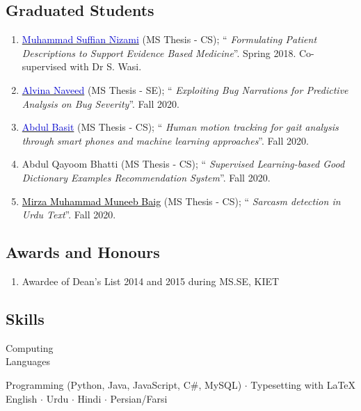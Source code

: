 \documentclass[a4paper, 10pt]{article}
\begin{document}
\subsection*{\textcolor{NavyBlue}{Graduated Students}}
\begin{enumerate}
\itemsep-4pt
\item \href{https://www.linkedin.com/in/msuffian/}{\textcolor{MediumBlue}{Muhammad Suffian Nizami}} (MS Thesis - CS); ``\emph{ Formulating Patient Descriptions to Support Evidence Based Medicine}''. Spring 2018. Co-supervised with Dr S. Wasi.

\item \href{https://www.linkedin.com/in/alvina-naveed-7832a0117/}{\textcolor{MediumBlue}{Alvina Naveed}} (MS Thesis - SE); ``\emph{ Exploiting Bug Narrations for Predictive Analysis on Bug Severity}''. Fall 2020.

\item \href{https://www.linkedin.com/in/abdul-basit-a151b0b9/}{\textcolor{MediumBlue}{Abdul Basit}} (MS Thesis - CS); ``\emph{ Human motion tracking for gait analysis through smart phones and machine learning approaches}''. Fall 2020.

\item Abdul Qayoom Bhatti (MS Thesis - CS); ``\emph{ Supervised Learning-based Good Dictionary Examples Recommendation System}''. Fall 2020.

\item \href{}{\textcolor{black}{Mirza Muhammad Muneeb Baig}} (MS Thesis - CS); ``\emph{ Sarcasm detection in Urdu Text}''. Fall 2020.
\end{enumerate}


\subsection*{\textcolor{NavyBlue}{Awards and Honours}}
\begin{enumerate}
\itemsep-4pt
\item Awardee of Dean's List 2014 and 2015 during MS.SE, KIET
\end{enumerate}


\subsection*{\textcolor{NavyBlue}{Skills}}
\hfill\begin{minipage}{0.17\textwidth}
Computing\textcolor{lightgray}{\dotfill}\\
Languages\textcolor{lightgray}{\dotfill}
\end{minipage}%
\begin{minipage}{0.8\textwidth}
Programming (Python, Java, JavaScript, C\#, MySQL) $\cdot$ Typesetting with \LaTeX\\
English $\cdot$ Urdu $\cdot$ Hindi $\cdot$ Persian/Farsi %
\end{minipage}
\end{document}
